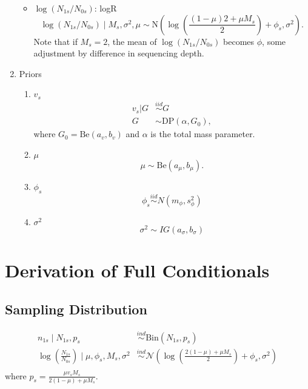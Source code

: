 \documentclass[12pt]{article}
\newcommand{\bc}{\mbox{\boldmath $c$}}
\newcommand{\Be}{\mbox{Be}}
\newcommand{\Nor}{\mbox{N}}
\newcommand{\Binom}{\mbox{Bin}}
\newcommand{\iid}{\stackrel{iid}{\sim}}
\begin{document}
\begin{enumerate}
\begin{itemize}
\item $\log(N_{1s}/N_{0s})$: logR
$$
\log(N_{1s}/N_{0s}) \mid M_s, \sigma^2, \mu \sim \Nor\left(\log\left(\frac{(1-\mu)2 + \mu M_s}{2}\right) + \phi_s, \sigma^2\right).
$$
Note that if $M_s=2$, the mean of $\log(N_{1s}/N_{0s})$ becomes $\phi$, some adjustment by difference in sequencing depth. 
\end{itemize}





\item Priors
\begin{enumerate}
\item $v_s$
\begin{align*}
  v_s | G &\iid G \\
  G &\sim \text{DP}(\alpha,G_0),
\end{align*}
where $G_0 = \Be(a_v, b_v)$ and $\alpha$ is the total mass parameter.

\item $\mu$
$$
\mu \sim \Be(a_\mu, b_\mu).
$$

\item $\phi_s$
  $$
  \phi_s \iid N(m_\phi, s^2_\phi)
  $$

\item $\sigma^2$
  $$
  \sigma^2 \sim IG(a_\sigma,b_\sigma)
  $$

\end{enumerate}
\end{enumerate}

\newpage
\newcommand{\ind}{\overset{ind}{\sim}}
\newcommand{\p}[1]{\left(#1\right)}
\newcommand{\bk}[1]{\left[#1\right]}
\renewcommand{\bc}[1]{ \left\{#1\right\} }
\newcommand{\abs}[1]{ \left|#1\right| }
\newcommand{\norm}[1]{ \left|\left|#1\right|\right| }
\newcommand{\N}{ \mathcal N }
\renewcommand{\L}{ \mathcal L }
\newcommand{\ds}{ \displaystyle }
\newcommand{\sums}{\sum_{s=1}^S}
\newcommand{\prods}{\prod_{s=1}^S}
\allowdisplaybreaks

\section{Derivation of Full Conditionals}
\subsection{Sampling Distribution}

\begin{align*}
  n_{1s} \mid N_{1s}, p_{s} &\ind \Binom(N_{1s}, p_{s}) \\
  \log\p{\frac{N_{1s}}{N_{0s}}} \mid \mu, \phi_s, M_s, \sigma^2 &\ind \N\p{\log\p{\frac{2(1-\mu)+\mu M_s}{2}}+\phi_s, \sigma^2}\\
\end{align*}
where $p_s = \ds\frac{\mu v_s M_s}{2(1-\mu)+\mu M_s}$.
\end{document}
